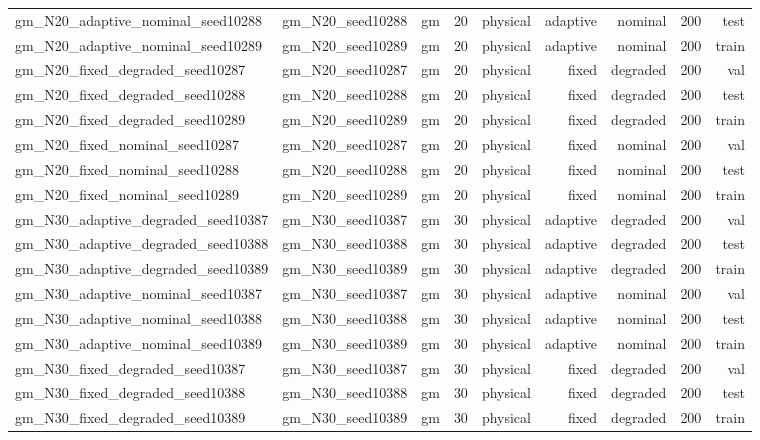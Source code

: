 \begin{tabular}{lrrrrrrrr}
gm\_N20\_adaptive\_nominal\_seed10288 & gm\_N20\_seed10288 & gm & 20 & physical & adaptive & nominal & 200 & test \\
gm\_N20\_adaptive\_nominal\_seed10289 & gm\_N20\_seed10289 & gm & 20 & physical & adaptive & nominal & 200 & train \\
gm\_N20\_fixed\_degraded\_seed10287 & gm\_N20\_seed10287 & gm & 20 & physical & fixed & degraded & 200 & val \\
gm\_N20\_fixed\_degraded\_seed10288 & gm\_N20\_seed10288 & gm & 20 & physical & fixed & degraded & 200 & test \\
gm\_N20\_fixed\_degraded\_seed10289 & gm\_N20\_seed10289 & gm & 20 & physical & fixed & degraded & 200 & train \\
gm\_N20\_fixed\_nominal\_seed10287 & gm\_N20\_seed10287 & gm & 20 & physical & fixed & nominal & 200 & val \\
gm\_N20\_fixed\_nominal\_seed10288 & gm\_N20\_seed10288 & gm & 20 & physical & fixed & nominal & 200 & test \\
gm\_N20\_fixed\_nominal\_seed10289 & gm\_N20\_seed10289 & gm & 20 & physical & fixed & nominal & 200 & train \\
gm\_N30\_adaptive\_degraded\_seed10387 & gm\_N30\_seed10387 & gm & 30 & physical & adaptive & degraded & 200 & val \\
gm\_N30\_adaptive\_degraded\_seed10388 & gm\_N30\_seed10388 & gm & 30 & physical & adaptive & degraded & 200 & test \\
gm\_N30\_adaptive\_degraded\_seed10389 & gm\_N30\_seed10389 & gm & 30 & physical & adaptive & degraded & 200 & train \\
gm\_N30\_adaptive\_nominal\_seed10387 & gm\_N30\_seed10387 & gm & 30 & physical & adaptive & nominal & 200 & val \\
gm\_N30\_adaptive\_nominal\_seed10388 & gm\_N30\_seed10388 & gm & 30 & physical & adaptive & nominal & 200 & test \\
gm\_N30\_adaptive\_nominal\_seed10389 & gm\_N30\_seed10389 & gm & 30 & physical & adaptive & nominal & 200 & train \\
gm\_N30\_fixed\_degraded\_seed10387 & gm\_N30\_seed10387 & gm & 30 & physical & fixed & degraded & 200 & val \\
gm\_N30\_fixed\_degraded\_seed10388 & gm\_N30\_seed10388 & gm & 30 & physical & fixed & degraded & 200 & test \\
gm\_N30\_fixed\_degraded\_seed10389 & gm\_N30\_seed10389 & gm & 30 & physical & fixed & degraded & 200 & train \\

\end{tabular}
